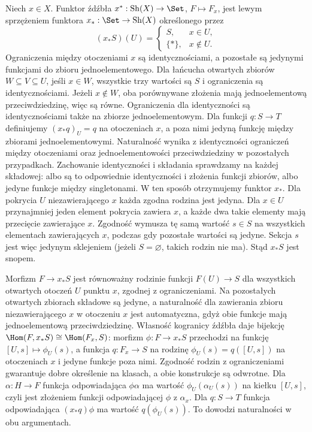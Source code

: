 \begin{przyklad}\label{cat:ex:topos-point}
Niech $x\in X$. Funktor źdźbła $x^*:\operatorname{Sh}(X)\to\Set$, $F\mapsto F_x$, jest lewym sprzężeniem funktora $x_*:\Set\to\operatorname{Sh}(X)$ określonego przez
\[
 (x_*S)(U)=
 \begin{cases}S,&x\in U,\\ \{*\},&x\notin U.\end{cases}
\]
Ograniczenia między otoczeniami $x$ są identycznościami, a pozostałe są jedynymi funkcjami do zbioru jednoelementowego. Dla łańcucha otwartych zbiorów $W\subseteq V\subseteq U$, jeśli $x\in W$, wszystkie trzy wartości są $S$ i ograniczenia są identycznościami. Jeżeli $x\notin W$, oba porównywane złożenia mają jednoelementową przeciwdziedzinę, więc są równe. Ograniczenia dla identyczności są identycznościami także na zbiorze jednoelementowym. Dla funkcji $q:S\to T$ definiujemy $(x_*q)_U=q$ na otoczeniach $x$, a poza nimi jedyną funkcję między zbiorami jednoelementowymi. Naturalność wynika z identyczności ograniczeń między otoczeniami oraz jednoelementowości przeciwdziedziny w pozostałych przypadkach. Zachowanie identyczności i składania sprawdzamy na każdej składowej: albo są to odpowiednie identyczności i złożenia funkcji zbiorów, albo jedyne funkcje między singletonami. W ten sposób otrzymujemy funktor $x_*$. Dla pokrycia $U$ niezawierającego $x$ każda zgodna rodzina jest jedyna. Dla $x\in U$ przynajmniej jeden element pokrycia zawiera $x$, a każde dwa takie elementy mają przecięcie zawierające $x$. Zgodność wymusza tę samą wartość $s\in S$ na wszystkich elementach zawierających $x$, podczas gdy pozostałe wartości są jedyne. Sekcja $s$ jest więc jedynym sklejeniem (jeżeli $S=\varnothing$, takich rodzin nie ma). Stąd $x_*S$ jest snopem.

Morfizm $F\to x_*S$ jest równoważny rodzinie funkcji $F(U)\to S$ dla wszystkich otwartych otoczeń $U$ punktu $x$, zgodnej z ograniczeniami. Na pozostałych otwartych zbiorach składowe są jedyne, a naturalność dla zawierania zbioru niezawierającego $x$ w otoczeniu $x$ jest automatyczna, gdyż obie funkcje mają jednoelementową przeciwdziedzinę. Własność kogranicy źdźbła daje bijekcję $\Hom(F,x_*S)\cong\Hom(F_x,S)$: morfizm $\phi:F\to x_*S$ przechodzi na funkcję $[U,s]\mapsto\phi_U(s)$, a funkcja $q:F_x\to S$ na rodzinę $\phi_U(s)=q([U,s])$ na otoczeniach $x$ i jedyne funkcje poza nimi. Zgodność rodzin z ograniczeniami gwarantuje dobre określenie na klasach, a obie konstrukcje są odwrotne. Dla $\alpha:H\to F$ funkcja odpowiadająca $\phi\alpha$ ma wartość $\phi_U(\alpha_U(s))$ na kiełku $[U,s]$, czyli jest złożeniem funkcji odpowiadającej $\phi$ z $\alpha_x$. Dla $q:S\to T$ funkcja odpowiadająca $(x_*q)\phi$ ma wartość $q(\phi_U(s))$. To dowodzi naturalności w obu argumentach.


\end{przyklad}
